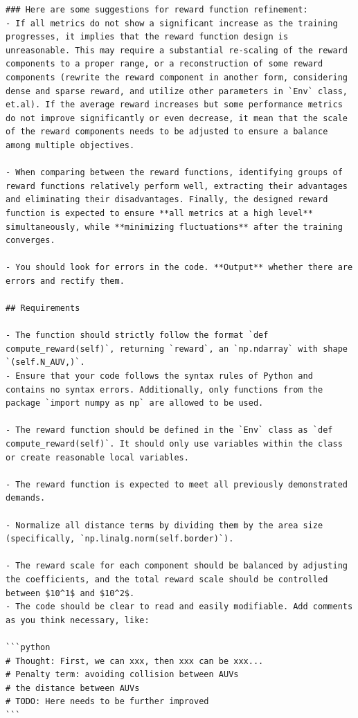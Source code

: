 \documentclass{article}
\begin{document}
\begin{verbatim}
### Here are some suggestions for reward function refinement:
- If all metrics do not show a significant increase as the training progresses, it implies that the reward function design is unreasonable. This may require a substantial re-scaling of the reward components to a proper range, or a reconstruction of some reward components (rewrite the reward component in another form, considering dense and sparse reward, and utilize other parameters in `Env` class, et.al). If the average reward increases but some performance metrics do not improve significantly or even decrease, it mean that the scale of the reward components needs to be adjusted to ensure a balance among multiple objectives. 

- When comparing between the reward functions, identifying groups of reward functions relatively perform well, extracting their advantages and eliminating their disadvantages. Finally, the designed reward function is expected to ensure **all metrics at a high level** simultaneously, while **minimizing fluctuations** after the training converges.

- You should look for errors in the code. **Output** whether there are errors and rectify them.

## Requirements

- The function should strictly follow the format `def compute_reward(self)`, returning `reward`, an `np.ndarray` with shape `(self.N_AUV,)`.
- Ensure that your code follows the syntax rules of Python and contains no syntax errors. Additionally, only functions from the package `import numpy as np` are allowed to be used.

- The reward function should be defined in the `Env` class as `def compute_reward(self)`. It should only use variables within the class or create reasonable local variables.

- The reward function is expected to meet all previously demonstrated demands.

- Normalize all distance terms by dividing them by the area size (specifically, `np.linalg.norm(self.border)`).

- The reward scale for each component should be balanced by adjusting the coefficients, and the total reward scale should be controlled between $10^1$ and $10^2$.
- The code should be clear to read and easily modifiable. Add comments as you think necessary, like:

```python
# Thought: First, we can xxx, then xxx can be xxx...
# Penalty term: avoiding collision between AUVs
# the distance between AUVs 
# TODO: Here needs to be further improved
```
\end{verbatim}
\end{document}
